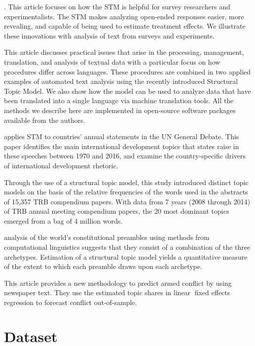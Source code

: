 \documentclass[12pt,a4paper,notitlepage]{article}
\begin{document}
\cite{roberts_structural_2014} . This article focuses on how the STM is helpful for survey researchers and experimentalists. The STM makes analyzing open-ended responses easier, more revealing, and capable of being used to estimate treatment effects. We illustrate these innovations with analysis of text from surveys and experiments.

\cite{lucas_computer_2015} This article discusses practical issues that arise in the processing, management, translation, and analysis of textual data with a particular focus on how procedures differ across languages. These procedures are combined in two applied examples of automated text analysis using the recently introduced Structural Topic Model. We also show how the model can be used to analyze data that have been translated into a single language via machine translation tools. All the methods we describe here are implemented in open-source software packages available from the authors.

\citet{baturo_what_2017} applies STM to countries’ annual statements in the UN General Debate. This paper identifies the main international development topics that states raise in these speeches between 1970 and 2016, and examine the country-specific drivers of international development rhetoric.

\cite{das_trends_2017} Through the use of a structural topic model, this study introduced distinct topic models on the basis of the relative frequencies of the words used in the abstracts of 15,357 TRB compendium papers. With data from 7 years (2008 through 2014) of TRB annual meeting compendium papers, the 20 most dominant topics emerged from a bag of 4 million words. 

\cite{law_constitutional_2016}  analysis of the world’s constitutional preambles using methods from computational linguistics suggests that they consist of a combination of the three archetypes. Estimation of a structural topic model yields a quantitative measure of the extent to which each preamble draws upon each archetype.

\cite{mueller_reading_2016} This article provides a new methodology to predict armed conflict by using newspaper text. They use the estimated topic shares in linear fixed effects regression to forecast conflict out-of-sample.
 

\section{Dataset}\label{ch_data}
\end{document}
